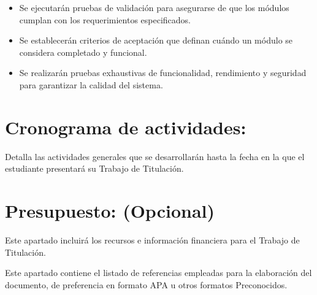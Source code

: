 \documentclass{article}
\begin{document}
\begin{itemize}
    \item Se ejecutarán pruebas de validación para asegurarse de que los módulos cumplan con los requerimientos especificados.
    \item Se establecerán criterios de aceptación que definan cuándo un módulo se considera completado y funcional.
    \item Se realizarán pruebas exhaustivas de funcionalidad, rendimiento y seguridad para garantizar la calidad del sistema.
\end{itemize}
\section{Cronograma de actividades:}
Detalla las actividades generales que se desarrollarán hasta la fecha en la que el estudiante presentará su Trabajo de Titulación. 

\section{Presupuesto: (Opcional)}

Este apartado incluirá los recursos e información financiera para el Trabajo de Titulación. 
%





\vspace{1cm}
Este apartado contiene el listado de referencias empleadas para la elaboración del documento, de preferencia en formato APA u otros formatos Preconocidos.
\end{document}
